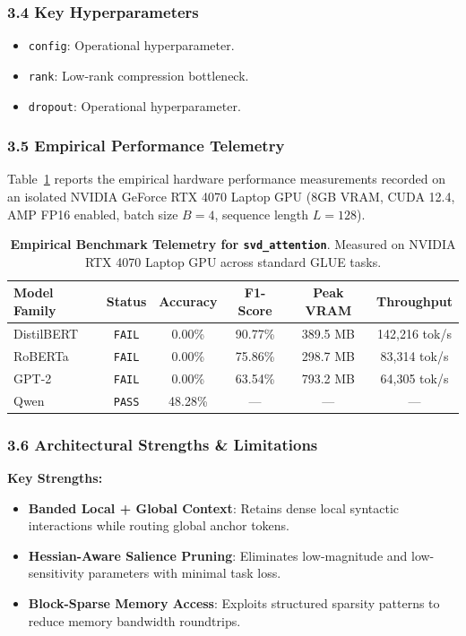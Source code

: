 \subsubsection*{3.4 Key Hyperparameters}
\begin{itemize}
    \item \texttt{config}: Operational hyperparameter.
    \item \texttt{rank}: Low-rank compression bottleneck.
    \item \texttt{dropout}: Operational hyperparameter.
\end{itemize}

\subsubsection*{3.5 Empirical Performance Telemetry}
Table~\ref{tab:telemetry_svd_attention} reports the empirical hardware performance measurements recorded on an isolated NVIDIA GeForce RTX 4070 Laptop GPU (8GB VRAM, CUDA 12.4, AMP FP16 enabled, batch size $B=4$, sequence length $L=128$).

\begin{table}[h]
\centering
\small
\caption{\textbf{Empirical Benchmark Telemetry for \texttt{svd\_attention}}. Measured on NVIDIA RTX 4070 Laptop GPU across standard GLUE tasks.}
\label{tab:telemetry_svd_attention}
\begin{tabular*}{\columnwidth}{@{\extracolsep{\fill}}lccccc}
\toprule
\textbf{Model Family} & \textbf{Status} & \textbf{Accuracy} & \textbf{F1-Score} & \textbf{Peak VRAM} & \textbf{Throughput} \\
\midrule
DistilBERT & \texttt{FAIL} & 0.00\% & 90.77\% & 389.5 MB & 142,216 tok/s \\
RoBERTa & \texttt{FAIL} & 0.00\% & 75.86\% & 298.7 MB & 83,314 tok/s \\
GPT-2 & \texttt{FAIL} & 0.00\% & 63.54\% & 793.2 MB & 64,305 tok/s \\
Qwen & \texttt{PASS} & 48.28\% & --- & --- & --- \\
\bottomrule
\end{tabular*}
\end{table}

\subsubsection*{3.6 Architectural Strengths \& Limitations}
\textbf{Key Strengths:}
\begin{itemize}
    \item \textbf{Banded Local + Global Context}: Retains dense local syntactic interactions while routing global anchor tokens.
    \item \textbf{Hessian-Aware Salience Pruning}: Eliminates low-magnitude and low-sensitivity parameters with minimal task loss.
    \item \textbf{Block-Sparse Memory Access}: Exploits structured sparsity patterns to reduce memory bandwidth roundtrips.
\end{itemize}

